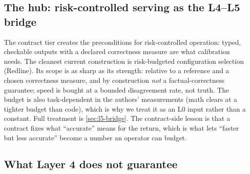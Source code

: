 \subsection{The hub: risk-controlled serving as the L4--L5 bridge}
\label{sec:l4-hub}

The contract tier creates the preconditions for risk-controlled operation: typed, checkable
outputs with a declared correctness measure are what calibration needs. The cleanest current
construction is risk-budgeted configuration selection (Redline).  Its scope is as sharp as its strength:
relative to a reference and a chosen correctness measure, and by construction \emph{not} a
factual-correctness guarantee; speed is bought at a bounded disagreement rate, not truth. The
budget is also task-dependent in the authors' measurements (math clears at a tighter budget
than code), which is why we treat it as an L0 input rather than a constant. Full treatment is
\cref{sec:l5-bridge}. The contract-side lesson is that a contract fixes what ``accurate'' means
for the return, which is what lets ``faster but less accurate'' become a number an operator can
budget.

\subsection{What Layer 4 does not guarantee}
\label{sec:l4-limits}

